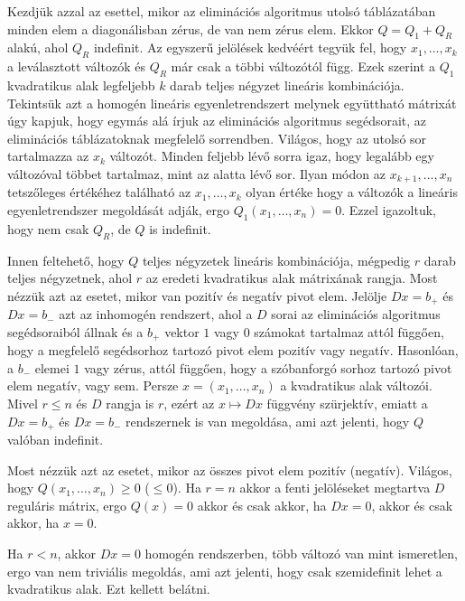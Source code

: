 \documentclass[a4paper, showtrims]{memoir}
\makeatletter
\renewenvironment{proof}[1][\proofname]
    {\par\pushQED{\qed}%
    \normalfont \topsep6\p@\@plus6\p@\relax
    \trivlist
    \item[\hskip\labelsep
        \itshape
    #1\@addpunct{:}]\ignorespaces}
    {\popQED\endtrivlist\@endpefalse}
\theoremstyle{plain}
\theoremstyle{remark}
\theoremstyle{definition}
\makeatother
\begin{document}
\begin{proof}
    Kezdjük azzal az esettel, 
    mikor az eliminációs algoritmus utolsó táblázatában minden elem a diagonálisban zérus,
    de van nem zérus elem.
    Ekkor $Q=Q_1+Q_R$ alakú, ahol $Q_R$ indefinit.
    Az egyszerű jelölések kedvéért tegyük fel, hogy $x_1,\dots,x_k$ a leválasztott változók
    és $Q_R$ már csak a többi változótól függ. 
    Ezek szerint a $Q_1$ kvadratikus alak legfeljebb $k$ darab teljes négyzet lineáris kombinációja.
    Tekintsük azt a homogén lineáris egyenletrendszert melynek együttható mátrixát úgy kapjuk, 
    hogy egymás alá írjuk az eliminációs algoritmus segédsorait, 
    az eliminációs táblázatoknak megfelelő sorrendben.
    Világos, hogy az utolsó sor tartalmazza az $x_k$ változót.
    Minden feljebb lévő sorra igaz, hogy legalább egy változóval többet tartalmaz,
    mint az alatta lévő sor.
    Ilyan módon az $x_{k+1}, \dots,x_{n}$ tetszőleges értékéhez található az $x_1,\dots,x_k$ olyan értéke
    hogy a változók a lineáris egyenletrendszer megoldását adják, ergo $Q_1\left( x_1,\dots,x_n \right)=0$.
    Ezzel igazoltuk, hogy nem csak $Q_R$, de $Q$ is indefinit.

    Innen feltehető, hogy $Q$ teljes négyzetek lineáris kombinációja, mégpedig $r$ darab teljes négyzetnek,
    ahol $r$ az eredeti kvadratikus alak mátrixának rangja.
    Most nézzük azt az esetet, mikor van pozitív és negatív pivot elem.
    Jelölje $Dx=b_+$ és $Dx=b_-$ azt az inhomogén rendszert, 
    ahol a $D$ sorai az eliminációs algoritmus segédsoraiból állnak és a $b_+$ vektor $1$ vagy $0$
    számokat tartalmaz attól függően, hogy a megfelelő segédsorhoz tartozó pivot elem pozitív vagy negatív.
    Hasonlóan, a $b_-$ elemei $1$ vagy zérus, 
    attól függően, hogy a szóbanforgó sorhoz tartozó pivot elem negatív, vagy sem.
    Persze $x=\left( x_1,\dots,x_n \right)$ a kvadratikus alak változói.
    Mivel $r\leq n$ és $D$ rangja is $r$, ezért az $x\mapsto Dx$ függvény szürjektív, emiatt a $Dx=b_+$ és 
    $Dx=b_-$ rendszernek is van megoldása, ami azt jelenti, hogy $Q$ valóban indefinit.

    Most nézzük azt az esetet, mikor az összes pivot elem pozitív (negatív).
    Világos, hogy $Q\left( x_1,\dots,x_n \right)\geq 0$ ($\leq 0$).
    Ha $r=n$ akkor a fenti jelöléseket megtartva $D$ reguláris mátrix, 
    ergo $Q\left( x \right)=0$ akkor és csak akkor, ha $Dx=0$, akkor és csak akkor, ha $x=0$.

    Ha $r<n$, akkor $Dx=0$ homogén rendszerben, több változó van mint ismeretlen, 
    ergo van nem triviális megoldás, ami azt jelenti, hogy csak szemidefinit lehet a kvadratikus alak.
    Ezt kellett belátni. 
\end{proof}
\end{document}
